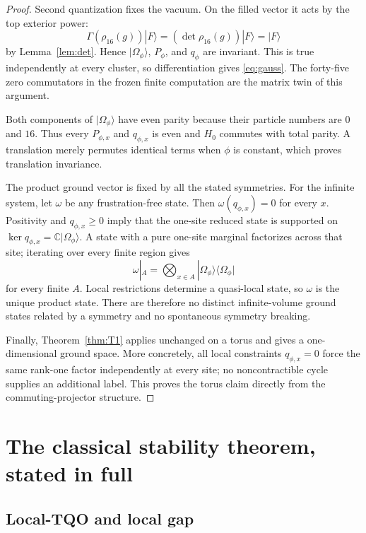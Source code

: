 \documentclass[11pt]{article}
\theoremstyle{remark}
\newcommand{\C}{\mathbb C}
\begin{document}
\begin{proof}
Second quantization fixes the vacuum.  On the filled vector it acts by
the top exterior power:
\[
 \Gamma(\rho_{16}(g))|F\rangle
 =(\det\rho_{16}(g))|F\rangle=|F\rangle
\]
by Lemma~\ref{lem:det}.  Hence $|\Omega_\phi\rangle$, $P_\phi$, and
$q_\phi$ are invariant.  This is true independently at every cluster,
so differentiation gives \eqref{eq:gauss}.  The forty-five zero
commutators in the frozen finite computation are the matrix twin of
this argument.

Both components of $|\Omega_\phi\rangle$ have even parity because
their particle numbers are $0$ and $16$.  Thus every $P_{\phi,x}$ and
$q_{\phi,x}$ is even and $H_0$ commutes with total parity.  A
translation merely permutes identical terms when $\phi$ is constant,
which proves translation invariance.

The product ground vector is fixed by all the stated symmetries.  For
the infinite system, let $\omega$ be any frustration-free state.
Then $\omega(q_{\phi,x})=0$ for every $x$.  Positivity and
$q_{\phi,x}\geq0$ imply that the one-site reduced state is supported
on $\ker q_{\phi,x}=\C|\Omega_\phi\rangle$.  A state with a pure
one-site marginal factorizes across that site; iterating over every
finite region gives
\[
 \omega|_A
 =\bigotimes_{x\in A}
 |\Omega_\phi\rangle\langle\Omega_\phi|
\]
for every finite $A$.  Local restrictions determine a quasi-local
state, so $\omega$ is the unique product state.  There are therefore
no distinct infinite-volume ground states related by a symmetry and
no spontaneous symmetry breaking.

Finally, Theorem~\ref{thm:T1} applies unchanged on a torus and gives a
one-dimensional ground space.  More concretely, all local constraints
$q_{\phi,x}=0$ force the same rank-one factor independently at every
site; no noncontractible cycle supplies an additional label.  This
proves the torus claim directly from the commuting-projector
structure.
\end{proof}

\section{The classical stability theorem, stated in full}

\subsection{Local-TQO and local gap}
\end{document}
